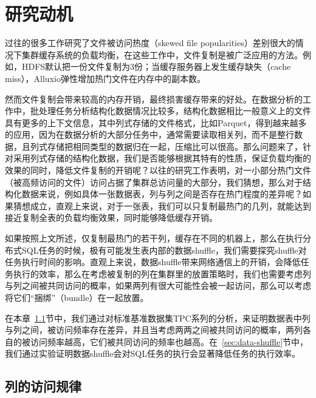 
\chapter{研究动机}
\label{chp:motivation}


\par 过往的很多工作研究了文件被访问热度（skewed file popularities）差别很大的情况下集群缓存系统的负载均衡，在这些工作中，文件复制是被广泛应用的方法。例如，HDFS默认把一份文件复制为3份；当缓存服务器上发生缓存缺失（cache miss），Alluxio弹性增加热门文件在内存中的副本数。

\par 然而文件复制会带来较高的内存开销，最终损害缓存带来的好处。在数据分析的工作中，批处理任务分析结构化数据情况比较多，结构化数据相比一般意义上的文件具有更多的上下文信息，其中列式存储的文件格式，比如Parquet\cite{parquet}，得到越来越多的应用，因为在数据分析的大部分任务中，通常需要读取相关列，而不是整行数据，且列式存储把相同类型的数据归在一起，压缩比可以很高。那么问题来了，针对采用列式存储的结构化数据，我们是否能够根据其特有的性质，保证负载均衡的效果的同时，降低文件复制的开销呢？以往的研究工作表明，对一小部分热门文件（被高频访问的文件）访问占据了集群总访问量的大部分，我们猜想，那么对于结构化数据来说，例如具体一张数据表，列与列之间是否存在热门程度的差异呢？如果猜想成立，直观上来说，对于一张表，我们可以只复制最热门的几列，就能达到接近复制全表的负载均衡效果，同时能够降低缓存开销。

\par 如果按照上文所述，仅复制最热门的若干列，缓存在不同的机器上，那么在执行分布式SQL任务的时候，极有可能发生表内部的数据shuffle，我们需要探究shuffle对任务执行时间的影响。直观上来说，数据shuffle带来网络通信上的开销，会降低任务执行的效率，那么在考虑被复制的列在集群里的放置策略时，我们也需要考虑列与列之间被共同访问的概率，如果两列有很大可能性会被一起访问，那么可以考虑将它们“捆绑”（bundle）在一起放置。

\par 在本章~\ref{sec:col-access}节中，我们通过对标准基准数据集TPC系列的分析，来证明数据表中列与列之间，被访问频率存在差异，并且当考虑两两之间被共同访问的概率，两列各自的被访问频率越高，它们被共同访问的频率也越高。在~\ref{sec:data-shuffle}节中，我们通过实验证明数据shuffle会对SQL任务的执行会显著降低任务的执行效率。

\section{列的访问规律}
\label{sec:col-access}

